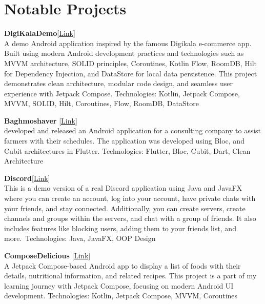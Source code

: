 \documentclass[a4paper,12pt]{article} %
\begin{document}
\section{Notable Projects}  
\vspace{0.5cm}
\begin{small}
\textbf{DigiKalaDemo}\hspace{1em}[\href{https://github.com/aliamrol/digikalademo}{Link}]
\\
A demo Android application inspired by the famous Digikala e-commerce app. Built using modern Android development practices and technologies such as MVVM architecture, SOLID principles, Coroutines, Kotlin Flow, RoomDB, Hilt for Dependency Injection, and DataStore for local data persistence. This project demonstrates clean architecture, modular code design, and seamless user experience with Jetpack Compose.\newline
Technologies: Kotlin, Jetpack Compose, MVVM, SOLID, Hilt, Coroutines, Flow, RoomDB, DataStore

\vspace{0.5cm}


\textbf{Baghmoshaver}\hspace{1em} [\href{https://cafebazaar.ir/app/com.example.bagh_moshaver}{Link}]\\
developed and released an Android application for a consulting company to assist farmers with their schedules. The application was developed using Bloc, and Cubit architectures in Flutter. \newline
Technologies: Flutter, Bloc, Cubit, Dart, Clean Architecture
\vspace{0.5cm}
\end{small}

\textbf{Discord}\hspace{1em}[\href{https://github.com/Aliamrol/Discord}{Link}]\\
This is a demo version of a real Discord application using Java and JavaFX where you can create an account, log into
your account, have private chats with your friends, and stay connected. Additionally, you can
create servers, create channels and groups within the servers, and chat with a group of friends. It also
includes features like blocking users, adding them to your friends list, and more.\newline\
Technologies: Java, JavaFX, OOP Design

\vspace{0.5cm}

\textbf{ComposeDelicious} \hspace{1em} [\href{https://github.com/Aliamrol/ComposeDelicious}{Link}]\\
A Jetpack Compose-based Android app to display a list of foods with their details, nutritional information, and related recipes. This project is a part of my learning journey with Jetpack Compose, focusing on modern Android UI development.\newline
Technologies: Kotlin, Jetpack Compose, MVVM, Coroutines
\end{document}
